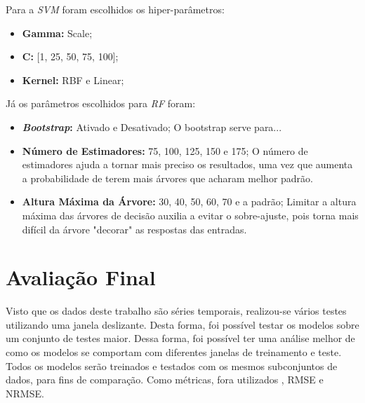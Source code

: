 Para a \textit{\acrshort{SVM}} foram escolhidos os hiper-parâmetros:

\begin{itemize}
    \item \textbf{Gamma:} Scale;
    \item \textbf{C:} [1, 25, 50, 75, 100];
    \item \textbf{Kernel:} RBF e Linear;
\end{itemize}

Já os parâmetros escolhidos para \textit{\acrshort{RF}} foram:

\begin{itemize}
    \item \textbf{\textit{Bootstrap}:} Ativado e Desativado;
    O bootstrap serve para...
    \item \textbf{Número de Estimadores:} 75, 100, 125, 150 e 175;
    O número de estimadores ajuda a tornar mais preciso os resultados, uma vez que aumenta a probabilidade de terem mais árvores que acharam melhor padrão.
    \item \textbf{Altura Máxima da Árvore:} 30, 40, 50, 60, 70 e a padrão;
    Limitar a altura máxima das árvores de decisão auxilia a evitar o sobre-ajuste, pois torna mais difícil da árvore "decorar" as respostas das entradas.
    
    
\end{itemize}

\section{Avaliação Final}




Visto que os dados deste trabalho são séries temporais, realizou-se vários testes utilizando uma janela deslizante. Desta forma, foi possível testar os modelos sobre um conjunto de testes maior. Dessa forma, foi possível ter uma análise melhor de como os modelos se comportam com diferentes janelas de treinamento e teste. Todos os modelos serão treinados e testados com os mesmos subconjuntos de dados, para fins de comparação. Como métricas, fora utilizados , \acrshort{RMSE} e \acrshort{NRMSE}. 

